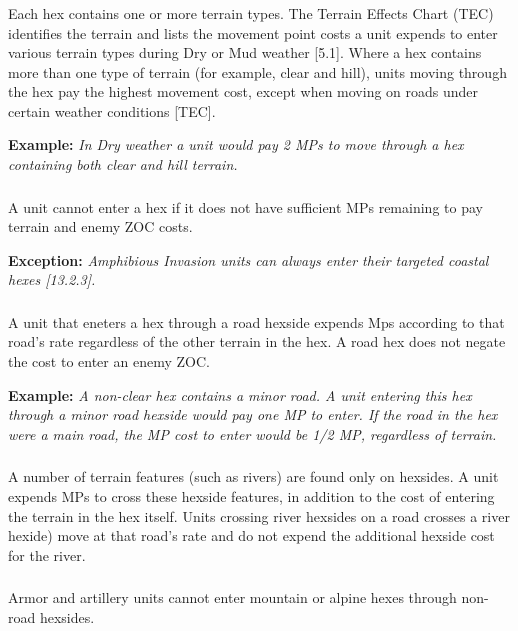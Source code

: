 \subsubsection{}
Each hex contains one or more terrain types. The Terrain Effects Chart (TEC) identifies the terrain and lists the movement point costs a unit expends to enter various terrain types during Dry or Mud weather [5.1]. Where a hex contains more than one type of terrain (for example, clear and hill), units moving through the hex pay the highest movement cost, except when moving on roads under certain weather conditions [TEC].

\textbf{Example:} \textit{In Dry weather a unit would pay 2 MPs to move through a hex containing both clear and hill terrain.}

\subsubsection{}
A unit cannot enter a hex if it does not have sufficient MPs remaining to pay terrain and enemy ZOC costs.

\textbf{Exception:} \textit{Amphibious Invasion units can always enter their targeted coastal hexes [13.2.3].}

\subsubsection{}
A unit that eneters a hex through a road hexside expends Mps according to that road's rate regardless of the other terrain in the hex. A road hex does not negate the cost to enter an enemy ZOC.

\textbf{Example:} \textit{A non-clear hex contains a minor road. A unit entering this hex through a minor road hexside would pay one MP to enter. If the road in the hex were a main road, the MP cost to enter would be 1/2 MP, regardless of terrain.}

\subsubsection{}
A number of terrain features (such as rivers) are found only on hexsides. A unit expends MPs to cross these hexside features, in addition to the cost of entering the terrain in the hex itself. Units crossing river hexsides on a road crosses a river hexide) move at that road's rate and do not expend the additional hexside cost for the river.

\subsubsection{}
Armor and artillery units cannot enter mountain or alpine hexes through non-road hexsides.